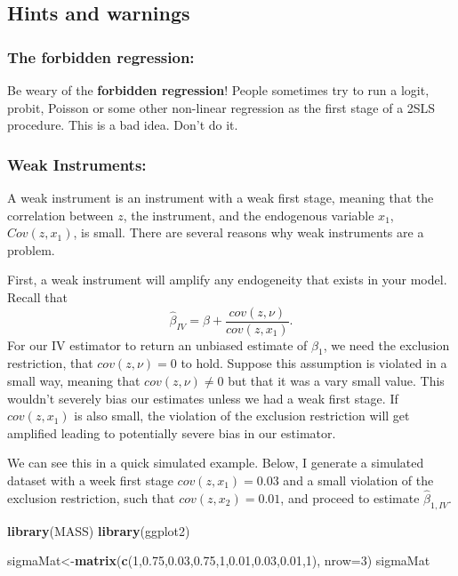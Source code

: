 \documentclass[
]{article}
\newenvironment{Shaded}{\begin{snugshade}}{\end{snugshade}}
\newcommand{\DataTypeTok}[1]{\textcolor[rgb]{0.13,0.29,0.53}{#1}}
\newcommand{\DecValTok}[1]{\textcolor[rgb]{0.00,0.00,0.81}{#1}}
\newcommand{\FloatTok}[1]{\textcolor[rgb]{0.00,0.00,0.81}{#1}}
\newcommand{\KeywordTok}[1]{\textcolor[rgb]{0.13,0.29,0.53}{\textbf{#1}}}
\newcommand{\NormalTok}[1]{#1}
\begin{document}
\subsection{Hints and warnings}

\subsubsection{The forbidden regression:}

Be weary of the \textbf{forbidden regression}! People sometimes try to
run a logit, probit, Poisson or some other non-linear regression as the
first stage of a 2SLS procedure. This is a bad idea. Don't do it.\\

\subsubsection{Weak Instruments:}

A weak instrument is an instrument with a weak first stage, meaning that
the correlation between \(z\), the instrument, and the endogenous
variable \(x_1\), \(Cov(z, x_1)\), is small. There are several reasons
why weak instruments are a problem.

First, a weak instrument will amplify any endogeneity that exists in
your model. Recall that \[
\hat{\beta}_{IV}=\beta+\frac{cov(z,\nu)}{cov(z,x_1)}.
\] For our IV estimator to return an unbiased estimate of \(\beta_1\),
we need the exclusion restriction, that \(cov(z,\nu)=0\) to hold.
Suppose this assumption is violated in a small way, meaning that
\(cov(z,\nu)\neq 0\) but that it was a vary small value. This wouldn't
severely bias our estimates unless we had a weak first stage. If
\(cov(z,x_1)\) is also small, the violation of the exclusion restriction
will get amplified leading to potentially severe bias in our estimator.

We can see this in a quick simulated example. Below, I generate a
simulated dataset with a week first stage \(cov(z,x_1)=0.03\) and a
small violation of the exclusion restriction, such that
\(cov(z,x_2)=0.01\), and proceed to estimate \(\hat{\beta}_{1,IV}\).

\begin{Shaded}
\begin{Highlighting}[]
\KeywordTok{library}\NormalTok{(MASS)}
\KeywordTok{library}\NormalTok{(ggplot2)}

\NormalTok{sigmaMat\textless{}{-}}\KeywordTok{matrix}\NormalTok{(}\KeywordTok{c}\NormalTok{(}\DecValTok{1}\NormalTok{,}\FloatTok{0.75}\NormalTok{,}\FloatTok{0.03}\NormalTok{,}\FloatTok{0.75}\NormalTok{,}\DecValTok{1}\NormalTok{,}\FloatTok{0.01}\NormalTok{,}\FloatTok{0.03}\NormalTok{,}\FloatTok{0.01}\NormalTok{,}\DecValTok{1}\NormalTok{), }\DataTypeTok{nrow=}\DecValTok{3}\NormalTok{)}
\NormalTok{sigmaMat}
\end{Highlighting}
\end{Shaded}
\end{document}
